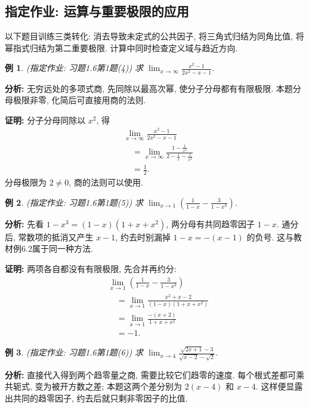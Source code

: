 \documentclass[UTF8,openany]{ctexbook}
\theoremstyle{chinesetextbook}
\newtheorem{example}{例}[section]
\newenvironment{cnproof}{\par\indent\textbf{证明:} \ignorespaces}{\par}
\begin{document}
\subsection{指定作业: 运算与重要极限的应用}
以下题目训练三类转化: 消去导致未定式的公共因子, 将三角式归结为同角比值, 将幂指式归结为第二重要极限. 计算中同时检查定义域与趋近方向.
\begin{example}
(指定作业: 习题1.6第1题(4)) 求 $\displaystyle \lim_{x\to\infty}\frac{x^2-1}{2x^2-x-1}$.
\end{example}
\par\indent\textbf{分析:} 无穷远处的多项式商, 先同除以最高次幂, 使分子分母都有有限极限. 本题分母极限非零, 化简后可直接用商的法则.
\begin{cnproof}
分子分母同除以 $x^2$, 得
\[
\begin{aligned}
&\lim_{x\to\infty}\frac{x^2-1}{2x^2-x-1}\\
&\quad=\lim_{x\to\infty}\frac{1-\frac1{x^2}}{2-\frac1x-\frac1{x^2}}\\
&\quad=\frac12.
\end{aligned}
\]
分母极限为 $2\ne0$, 商的法则可以使用.
\end{cnproof}
\begin{example}
(指定作业: 习题1.6第1题(5)) 求 $\displaystyle \lim_{x\to1}(\frac1{1-x}-\frac3{1-x^3})$.
\end{example}
\par\indent\textbf{分析:} 先看 $1-x^3=(1-x)(1+x+x^2)$, 两分母有共同趋零因子 $1-x$. 通分后, 常数项的抵消又产生 $x-1$, 约去时别漏掉 $1-x=-(x-1)$ 的负号. 这与教材例6.2属于同一种方法.
\begin{cnproof}
两项各自都没有有限极限, 先合并再约分:
\[
\begin{aligned}
&\lim_{x\to1}\left(\frac1{1-x}-\frac3{1-x^3}\right)\\
&\quad=\lim_{x\to1}\frac{x^2+x-2}{(1-x)(1+x+x^2)}\\
&\quad=\lim_{x\to1}\frac{-(x+2)}{1+x+x^2}\\
&\quad=-1.
\end{aligned}
\]
\end{cnproof}
\begin{example}
(指定作业: 习题1.6第1题(6)) 求 $\displaystyle \lim_{x\to4}\frac{\sqrt{2x+1}-3}{\sqrt{x-2}-\sqrt2}$.
\end{example}
\par\indent\textbf{分析:} 直接代入得到两个趋零量之商, 需要比较它们趋零的速度. 每个根式差都可乘共轭式, 变为被开方数之差; 本题这两个差分别为 $2(x-4)$ 和 $x-4$. 这样便显露出共同的趋零因子, 约去后就只剩非零因子的比值.
\end{document}
